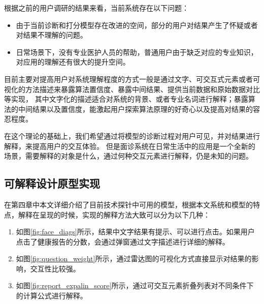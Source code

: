 根据之前的用户调研的结果来看，当前系统存在以下问题：

\begin{itemize}
    \item 由于当前诊断和打分模型存在改进的空间，部分的用户对结果产生了怀疑或者对结果不理解的问题。
    \item 日常场景下，没有专业医护人员的帮助，普通用户由于缺乏对应的专业知识，对应用的理解还有很大的提升空间。
\end{itemize}


目前主要对提高用户对系统理解程度的方式一般是通过文字、可交互式元素或者可视化的方法描述来暴露算法置信度、暴露中间结果、提供当前数据和原始数据对比等实现\cite{wang2019designing, kocielnik2019will}，
其中文字化的描述适合对系统的背景、或者专业名词进行解释；暴露算法的中间结果以及置信度，能激起用户探索算法原理的好奇心以及提高对结果的容忍程度。


在这个理论的基础上，我们希望通过将模型的诊断过程对用户可见，并对结果进行解释，来提高用户的交互体验。
但是面诊系统在日常生活中的应用是一个全新的场景，需要解释的对象是什么，通过何种交互元素进行解释，仍是未知的问题。




\subsection{可解释设计原型实现}

在第四章中本文详细介绍了目前技术探针中可用的模型，根据本文系统和模型的特点，解释在呈现的时候，实现的解释方法大致可以分为以下几种：

\begin{enumerate}
    \item 如图\ref{fig:face_diags}所示，结果中文字结果有提示、可以进行点击。如果用户点击了健康报告的分数，会通过弹窗通过文字描述进行详细的解释。

    \item 如图\ref{fig:question_weight}所示，通过雷达图的可视化方式直接显示对结果的影响，交互性比较强。 
    
    \item 如图\ref{fig:report_expalin_score}所示，通过可交互元素折叠列表对不同条件下的计算公式进行解释。
\end{enumerate}

